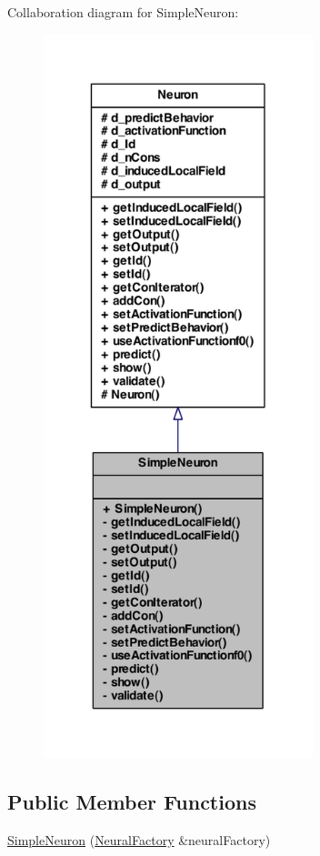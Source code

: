 Collaboration diagram for SimpleNeuron:
\nopagebreak
\begin{figure}[H]
\begin{center}
\leavevmode
\includegraphics[width=222pt]{class_simple_neuron__coll__graph}
\end{center}
\end{figure}
\subsection*{Public Member Functions}
\begin{DoxyCompactItemize}
\item 
\hyperlink{class_simple_neuron_adb0becb30ddc511aba5cc7cadea9d981}{SimpleNeuron} (\hyperlink{class_neural_factory}{NeuralFactory} \&neuralFactory)
\end{DoxyCompactItemize}
